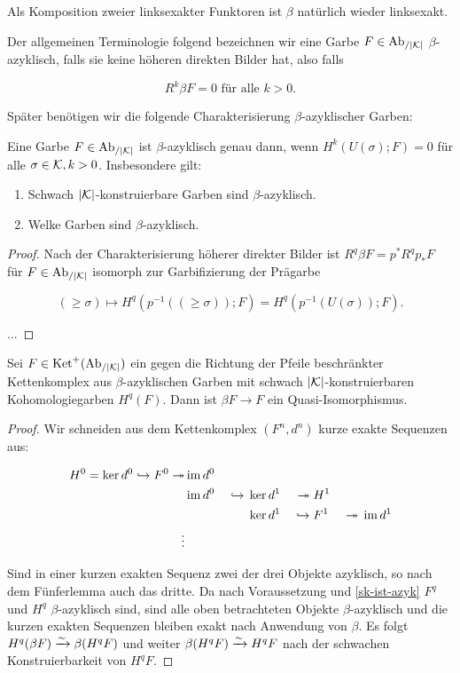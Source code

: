 Als Komposition zweier linksexakter Funktoren ist $\beta$ natürlich
wieder linksexakt.

Der allgemeinen Terminologie folgend bezeichnen wir eine Garbe $F \in
\operatorname{Ab}_{/|\mathcal{K}|}$ $\beta$-azyklisch, falls sie keine höheren direkten Bilder hat,
also falls

\[ R^k\beta F = 0 \text{ für alle } k > 0.  \]

Später benötigen wir die folgende Charakterisierung
$\beta$-azyklischer Garben:

\begin{prop} \label{sk-ist-azyk}
  Eine Garbe $F \in \operatorname{Ab}_{/|\mathcal{K}|}$ ist $\beta$-azyklisch genau dann, wenn
  $H^k(U(\sigma); F) = 0$ für alle $\sigma \in \mathcal{K}, k >
  0$. Insbesondere gilt:
  \begin{enumerate}
  \item Schwach $|\mathcal{K}|$-konstruierbare Garben sind $\beta$-azyklisch.
  \item Welke Garben sind $\beta$-azyklisch.
  \end{enumerate}  
\end{prop}
\begin{proof}
  Nach der Charakterisierung höherer direkter Bilder ist $R^q \beta F
  = p^* R^q p_* F$ für $F \in \operatorname{Ab}_{/|\mathcal{K}|}$ isomorph zur Garbifizierung der
  Prägarbe

  \[ (\geq \sigma) \mapsto H^q(p^{-1}((\geq \sigma)); F) = H^q(p^{-1}(U(\sigma)); F). \]

  ...
\end{proof}


\begin{prop}
  Sei $F \in \operatorname{Ket}^+(\operatorname{Ab}_{/|\mathcal{K}|})$ ein gegen die Richtung der Pfeile
  beschränkter Kettenkomplex aus $\beta$-azy\-klischen Garben mit
  schwach $|\mathcal{K}|$-kon\-stru\-ier\-bar\-en Kohomologiegarben $H^q(F)$. Dann
  ist $\beta F \to F$ ein Quasi-Iso\-mor\-phis\-mus.
\end{prop}
\begin{proof}
  Wir schneiden aus dem Kettenkomplex $(F^n, d^n)$ kurze exakte
  Sequenzen aus:
  
  \begin{alignat*}{4}
    H^0 = \ker d^0 \hookrightarrow F^0 \twoheadrightarrow &\operatorname{im} d^0 & & \\
    &\operatorname{im} d^0& {} \hookrightarrow {} &\ker d^1& {}\twoheadrightarrow {} &H^1& \\
    && &\ker d^1& {} \hookrightarrow {} &F^1& {} \twoheadrightarrow {} \operatorname{im} d^1 \\
    \vdots
  \end{alignat*}
  
  Sind in einer kurzen exakten Sequenz zwei der drei Objekte
  azyklisch, so nach dem Fünferlemma auch das dritte. Da nach
  Voraussetzung und \ref{sk-ist-azyk} $F^q$ und $H^q$
  $\beta$-azyklisch sind, sind alle oben betrachteten Objekte
  $\beta$-azyklisch und die kurzen exakten Sequenzen bleiben exakt
  nach Anwendung von $\beta$. Es folgt $H^q(\beta F) \xrightarrow{\sim} \beta (H^q
  F)$ und weiter $\beta (H^q F) \xrightarrow{\sim} H^q F$ nach der schwachen
  Konstruierbarkeit von $H^q F$.
\end{proof}

